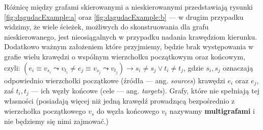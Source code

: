 Różnicę między grafami skierowanymi a nieskierowanymi przedstawiają rysunki \ref{fig:dagudacExample:a} oraz \ref{fig:dagudacExample:b} --- w drugim przypadku widzimy, że wiele ścieżek, możliwych do skonstruowania dla grafu nieskierowanego, jest nieosiągalnych w przypadku nadania krawędziom kierunku. Dodatkowo ważnym założeniem które przyjmiemy, będzie brak występowania w grafie wielu krawędzi o wspólnym wierzchołku początkowym oraz końcowym, czyli: $\left( e_{i} \equiv v_{s_{i}} \leadsto v_{t_{i}} \neq e_{j} \equiv v_{s_{j}} \leadsto v_{t_{j}} \right) \rightarrow s_{i} \neq s_{j} \vee t_{i} \neq t_{j}$, gdzie $s_{i}, s_{j}$ oznaczają odpowiednio wierzchołki początkowe (źródła --- ang. \textit{sources}) krawędzi $e_{i}$ oraz $e_{j}$, zaś $t_{i}, t_{j}$ --- ich węzły końcowe (cele --- ang. \textit{targets}). Grafy, które nie spełniają tej własności (posiadają więcej niż jedną krawędź prowadzącą bezpośrednio z wierzchołka początkowego $v_{s}$ do węzła końcowego $v_{t}$ nazywamy \textbf{multigrafami} i nie będziemy się nimi zajmować.)

